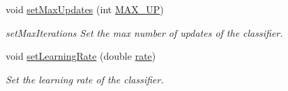 \begin{DoxyCompactItemize}
void \hyperlink{class_classifier_a343905df8798ef1e29983d4582a1cdb6}{set\+Max\+Updates} (int \hyperlink{class_classifier_a8d3289755d689efa65ca009d4c4ffa13}{M\+A\+X\+\_\+\+UP})
\begin{DoxyCompactList}\small\item\em set\+Max\+Iterations Set the max number of updates of the classifier. \end{DoxyCompactList}\item 
void \hyperlink{class_classifier_ae705171568ea2066b619609af614129e}{set\+Learning\+Rate} (double \hyperlink{class_classifier_a7b1c4ef87631bd9e46682e5bc4315111}{rate})
\begin{DoxyCompactList}\small\item\em Set the learning rate of the classifier. \end{DoxyCompactList}\end{DoxyCompactItemize}

